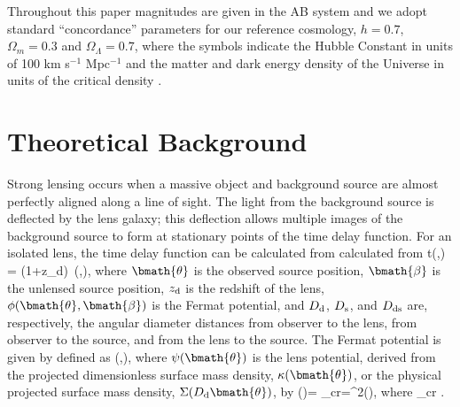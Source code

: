 \documentclass[useAMS,usenatbib]{mn2e}
\begin{document}
Throughout this paper magnitudes are given in the AB system \citep{Oke74} and
we adopt standard ``concordance'' parameters for our reference cosmology, \ie
$h=0.7$, $\Omega_m=0.3$ and $\Omega_\Lambda=0.7$, where the symbols indicate
the Hubble Constant in units of 100 km s$^{-1}$ Mpc$^{-1}$ and the matter and
dark energy density of the Universe in units of the critical density
\citep[e.g.\ ][]{Kom++09}.



\section{Theoretical Background}
\label{sec:theory}


Strong lensing occurs when a massive object and background source are almost perfectly
aligned along a line of sight. The light from the background source is deflected by the
lens galaxy; this deflection allows multiple images of the background source to form
at stationary points of the time delay function. For an isolated lens, the time delay
function can be calculated from calculated from 
\be \label{eq:T} 
\Delta t(\bmath{\theta},\bmath{\beta}) =   (1+z_{\rm d})\, \phi(\bmath{\theta},\bmath{\beta}),
\ee
where $\bmath{\theta}$ is the observed source position, $\bmath{\beta}$ is the 
unlensed source position, $z_{\rm d}$ is the redshift of the lens, $\phi(\bmath{\theta},\bmath{\beta})$ is
the Fermat potential, and $D_{\rm d}$, $D_{\rm s}$, and $D_{\rm ds}$
are, respectively, the angular diameter distances from observer to the lens, from observer
to the source, and from the lens to the source. The Fermat potential is given by
defined as
\be \label{eq:FP}
\phi(\bmath{\theta},\bmath{\beta})\equiv {}, 
\ee
where $\psi(\bmath{\theta})$ is the lens potential, derived from the projected dimensionless
surface mass density, $\kappa(\bmath{\theta})$, or the physical projected surface mass density,
$\Sigma(D_{\rm d} \bmath{\theta})$, by 
\be \label{eq:psikappa}
\kappa(\bmath{\theta})=  {\Sigma_{\rm cr}}=\nabla^2\psi(\bmath{\theta}),
\ee
where 
\be \label{eq:sigcrit} 
\Sigma_{\rm cr} \equiv {}.
\ee
\end{document}
